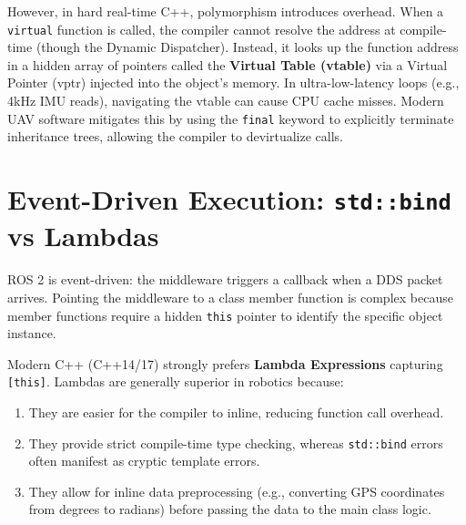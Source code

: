 \documentclass{article}
\begin{document}
However, in hard real-time C++, polymorphism introduces overhead. 
When a \texttt{virtual} function is called, the compiler cannot resolve the address at compile-time (though the Dynamic Dispatcher). 
Instead, it looks up the function address in a hidden array of pointers called the \textbf{Virtual Table (vtable)} via a Virtual Pointer (vptr) 
injected into the object's memory. In ultra-low-latency loops (e.g., 4kHz IMU reads), navigating the vtable can cause CPU cache misses. 
Modern UAV software mitigates this by using the \texttt{final} keyword to explicitly terminate inheritance trees, allowing the compiler to devirtualize calls.

\section{Event-Driven Execution: \texttt{std::bind} vs Lambdas}
ROS 2 is event-driven: the middleware triggers a callback when a DDS packet arrives. 
Pointing the middleware to a class member function is complex because member functions require a hidden \texttt{this} pointer to identify the specific object instance.

Modern C++ (C++14/17) strongly prefers \textbf{Lambda Expressions} capturing \texttt{[this]}. Lambdas are generally superior 
in robotics because:

\begin{enumerate}
    \item They are easier for the compiler to inline, reducing function call overhead.
    \item They provide strict compile-time type checking, whereas \texttt{std::bind} errors often manifest as cryptic template errors.
    \item They allow for inline data preprocessing (e.g., converting GPS coordinates from degrees to radians) before passing the data to the main 
    class logic.
\end{enumerate}
\end{document}
